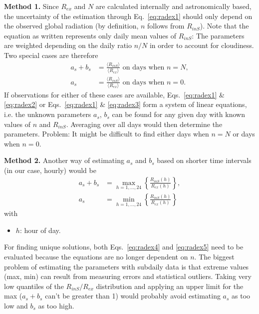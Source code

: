 \documentclass{scrreprt}
\newenvironment{denseitem}{
  \begin{itemize}
    \setlength{\itemsep}{0pt}
    \setlength{\parskip}{0pt}
    \setlength{\parsep}{0pt}
}{
  \end{itemize}
}
\begin{document}
\textbf{Method 1.}
Since $R_{ex}$ and $N$ are calculated internally and astronomically based, the uncertainty of the estimation through Eq.~\eqref{eq:radex1} should only depend on the observed global radiation (by definition, $n$ follows from $R_{inS}$).
Note that the equation as written represents only daily mean values of $R_{inS}$:
The parameters are weighted depending on the daily ratio $n/N$ in order to account for cloudiness.
Two special cases are therefore
\begin{align}
  a_s + b_s &= \frac{\langle R_{inS} \rangle}{\langle R_{ex} \rangle} \text{ on days when } n=N, \label{eq:radex2} \\
  a_s &= \frac{\langle R_{inS} \rangle}{\langle R_{ex} \rangle} \text{ on days when } n=0. \label{eq:radex3}
\end{align}
%
If observations for either of these cases are available, Eqs.~\eqref{eq:radex1} \& \eqref{eq:radex2} or Eqs.~\eqref{eq:radex1} \& \eqref{eq:radex3} form a system of linear equations, i.e. the unknown parameters $a_s$, $b_s$ can be found for any given day with known values of $n$ and $R_{inS}$.
Averaging over all days would then determine the parameters.
Problem: It might be difficult to find either days when $n=N$ or days when $n=0$.

\textbf{Method 2.}
Another way of estimating $a_s$ and $b_s$ based on shorter time intervals (in our case, hourly) would be
\begin{align}
  a_s + b_s &= \max_{h = 1, ..., 24} \left \{ \frac{R_{inS} (h)}{R_{ex} (h)} \right \}, \label{eq:radex4} \\
  a_s &= \min_{h = 1, ..., 24} \left \{ \frac{R_{inS} (h)}{R_{ex} (h)} \right \} \label{eq:radex5}
\end{align}
%
with
\begin{denseitem}
  \item[] $h$: hour of day.
\end{denseitem}
%
For finding unique solutions, both Eqs.~\eqref{eq:radex4} and \eqref{eq:radex5} need to be evaluated because the equations are no longer dependent on $n$.
The biggest problem of estimating the parameters with subdaily data is that extreme values (max, min) can result from measuring errors and statistical outliers.
Taking very low quantiles of the $R_{inS}/R_{ex}$ distribution and applying an upper limit for the max ($a_s + b_s$ can't be greater than 1) would probably avoid estimating $a_s$ as too low and $b_s$ as too high.
\end{document}
